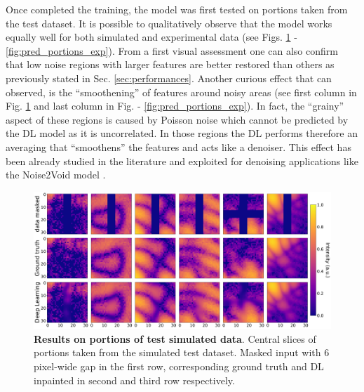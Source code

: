 Once completed the training, the model was first tested on portions taken from the test dataset. It is possible
to qualitatively observe that the model works equally well for both simulated and experimental data (see Figs. \ref{fig:pred_portions_sim}
- \ref{fig:pred_portions_exp}). From a first visual assessment one can also confirm that low noise regions with larger features
are better restored than others as previously stated in Sec. \ref{sec:performances}. Another curious effect that can observed, 
is the ``smoothening'' of features around noisy areas (see first column in Fig. \ref{fig:pred_portions_sim} and last column in Fig.
- \ref{fig:pred_portions_exp}). In fact, the ``grainy'' aspect of these regions is caused by Poisson noise which cannot
be predicted by the DL model as it is uncorrelated. In those regions the DL performs therefore an averaging that 
``smoothens'' the features and acts like a denoiser. This effect has been already studied in the literature and exploited 
for denoising applications like the Noise2Void model \cite{Noise2Void}.

\begin{figure}[H]
    \centering
    \includegraphics[width=\textwidth]{figures/Inpainting/prediction_small_simulated.pdf}
    \caption{\textbf{Results on portions of test simulated data}. Central slices of portions taken from the simulated test
    dataset. Masked input with 6 pixel-wide gap in the first row, corresponding ground truth and DL inpainted in second and third
    row respectively.}
    \label{fig:pred_portions_sim}
\end{figure}


